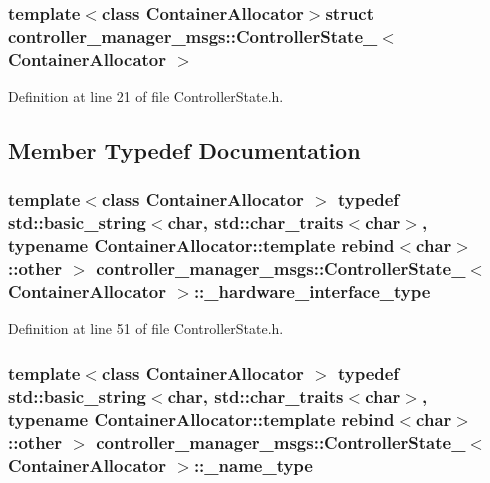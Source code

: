 \subsubsection*{template$<$class Container\-Allocator$>$struct controller\-\_\-manager\-\_\-msgs\-::\-Controller\-State\-\_\-$<$ Container\-Allocator $>$}



\-Definition at line 21 of file \-Controller\-State.\-h.



\subsection{\-Member \-Typedef \-Documentation}
\subsubsection[{\-\_\-hardware\-\_\-interface\-\_\-type}]{\setlength{\rightskip}{0pt plus 5cm}template$<$class Container\-Allocator $>$ typedef std\-::basic\-\_\-string$<$char, std\-::char\-\_\-traits$<$char$>$, typename \-Container\-Allocator\-::template rebind$<$char$>$\-::other $>$ {\bf controller\-\_\-manager\-\_\-msgs\-::\-Controller\-State\-\_\-}$<$ \-Container\-Allocator $>$\-::{\bf \-\_\-hardware\-\_\-interface\-\_\-type}}\label{structcontroller__manager__msgs_1_1ControllerState___a08db08dcc3e67e9aa4c1c80a8bbf44fd}


\-Definition at line 51 of file \-Controller\-State.\-h.

\subsubsection[{\-\_\-name\-\_\-type}]{\setlength{\rightskip}{0pt plus 5cm}template$<$class Container\-Allocator $>$ typedef std\-::basic\-\_\-string$<$char, std\-::char\-\_\-traits$<$char$>$, typename \-Container\-Allocator\-::template rebind$<$char$>$\-::other $>$ {\bf controller\-\_\-manager\-\_\-msgs\-::\-Controller\-State\-\_\-}$<$ \-Container\-Allocator $>$\-::{\bf \-\_\-name\-\_\-type}}\label{structcontroller__manager__msgs_1_1ControllerState___a9b2fd4980fc1e40093e7721b15afc7ae}


